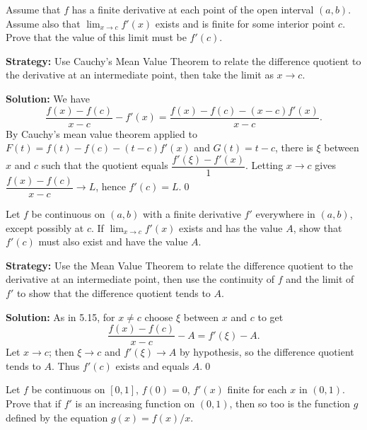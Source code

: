 \begin{problembox}
\begin{problemstatement}
Assume that \( f \) has a finite derivative at each point of the open interval \( (a, b) \). Assume also that \( \lim_{x \to c} f'(x) \) exists and is finite for some interior point \( c \). Prove that the value of this limit must be \( f'(c) \).
\end{problemstatement}
\end{problembox}

\noindent\textbf{Strategy:} Use Cauchy's Mean Value Theorem to relate the difference quotient to the derivative at an intermediate point, then take the limit as \( x \to c \).

\bigskip\noindent\textbf{Solution:}
We have
\[\frac{f(x)-f(c)}{x-c}-f'(x)=\frac{f(x)-f(c)-(x-c)f'(x)}{x-c}.\]
By Cauchy's mean value theorem applied to $F(t)=f(t)-f(c)-(t-c)f'(x)$ and $G(t)=t-c$, there is $\xi$ between $x$ and $c$ such that the quotient equals $\dfrac{f'(\xi)-f'(x)}{1}$. Letting $x\to c$ gives $\dfrac{f(x)-f(c)}{x-c}\to L$, hence $f'(c)=L$.\qed


\begin{problembox}
\begin{problemstatement}
Let \( f \) be continuous on \( (a, b) \) with a finite derivative \( f' \) everywhere in \( (a, b) \), except possibly at \( c \). If \( \lim_{x \to c} f'(x) \) exists and has the value \( A \), show that \( f'(c) \) must also exist and have the value \( A \).
\end{problemstatement}
\end{problembox}

\noindent\textbf{Strategy:} Use the Mean Value Theorem to relate the difference quotient to the derivative at an intermediate point, then use the continuity of \( f \) and the limit of \( f' \) to show that the difference quotient tends to \( A \).

\bigskip\noindent\textbf{Solution:}
As in 5.15, for $x\ne c$ choose $\xi$ between $x$ and $c$ to get
\[\frac{f(x)-f(c)}{x-c}-A=f'(\xi)-A.\]
Let $x\to c$; then $\xi\to c$ and $f'(\xi)\to A$ by hypothesis, so the difference quotient tends to $A$. Thus $f'(c)$ exists and equals $A$.\qed


\begin{problembox}
\begin{problemstatement}
Let \( f \) be continuous on \( [0, 1] \), \( f(0) = 0 \), \( f'(x) \) finite for each \( x \) in \( (0, 1) \). Prove that if \( f' \) is an increasing function on \( (0, 1) \), then so too is the function \( g \) defined by the equation \( g(x) = f(x)/x \).
\end{problemstatement}
\end{problembox}

